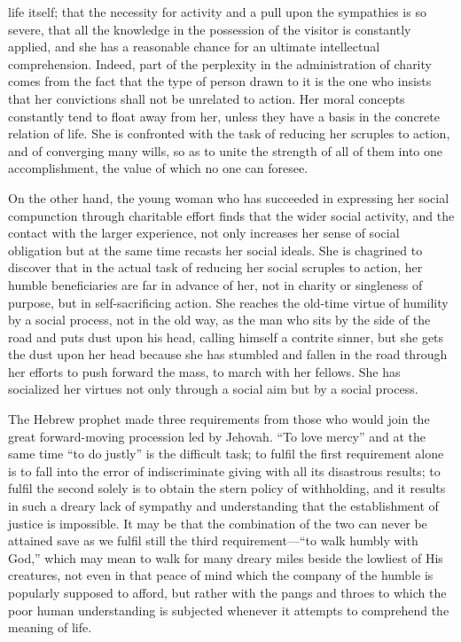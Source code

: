 \documentclass[]{article}
\begin{document}
\begin{sectionbody}
life itself; that the necessity for activity and a pull upon the
sympathies is so severe, that all the knowledge in the possession of the
visitor is constantly applied, and she has a reasonable chance for an
ultimate intellectual comprehension. Indeed, part of the perplexity in
the administration of charity comes from the fact that the type of
person drawn to it is the one who insists that her convictions shall not
be unrelated to action. Her moral concepts constantly tend to float away
from her, unless they have a basis in the concrete relation of life. She
is confronted with the task of reducing her scruples to action, and of
converging many wills, so as to unite the strength of all of them into
one accomplishment, the value of which no one can foresee.

\addamsparagraph On the other hand, the young woman who has succeeded in expressing her
social compunction through charitable effort finds that the wider
social activity, and the contact with the larger experience, not only
increases her sense of social obligation but at the same time recasts
her social ideals. She is chagrined to discover that in the actual task
of reducing her social scruples to action, her humble beneficiaries are
far in advance of her, not in charity or singleness of purpose, but in
self-sacrificing action. She reaches the old-time virtue of humility by
a social process, not in the old way, as the man who sits by the side of
the road and puts dust upon his head, calling himself a contrite sinner,
but she gets the dust upon her head because she has stumbled and fallen
in the road through her efforts to push forward the mass, to march with
her fellows. She has socialized her virtues not only through a social
aim but by a social process.

\addamsparagraph The Hebrew prophet made three requirements from those who would join the
great forward-moving procession led by Jehovah. ``To love mercy'' and at
the same time ``to do justly'' is the difficult task; to fulfil the first
requirement alone is to fall into the error of indiscriminate giving
with all its disastrous results; to fulfil the second solely is to
obtain the stern policy of withholding, and it results in such a dreary
lack of sympathy and understanding that the establishment of justice is
impossible. It may be that the combination of the two can never be
attained save as we fulfil still the third requirement---``to walk humbly
with God,'' which may mean to walk for many dreary miles beside the
lowliest of His creatures, not even in that peace of mind which the
company of the humble is popularly supposed to afford, but rather with
the pangs and throes to which the poor human understanding is subjected
whenever it attempts to comprehend the meaning of life.

\end{sectionbody}
\end{document}
